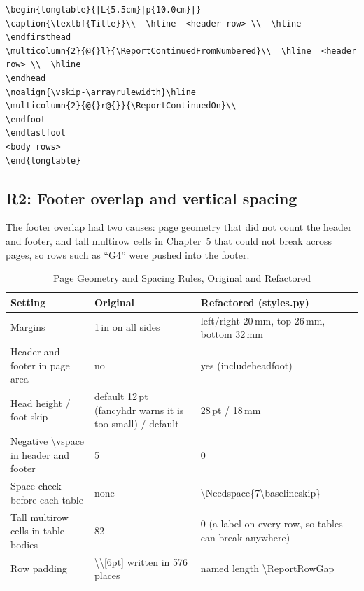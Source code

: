 \documentclass[11pt,a4paper]{article}
\newcommand{\thead}{\rowcolor{headbg}}
\newcommand{\hd}[1]{\sffamily\bfseries\color{ink}#1}
\newcommand{\breakus}{\textunderscore\allowbreak}
\newcommand{\code}[1]{{\ttfamily\let\_\breakus #1}}
\newcommand{\file}[1]{{\ttfamily\let\_\breakus #1}}
\newcommand{\bs}{\textbackslash}
\begin{document}
\begin{lstlisting}
\begin{longtable}{|L{5.5cm}|p{10.0cm}|}
\caption{\textbf{Title}}\\  \hline  <header row> \\  \hline
\endfirsthead
\multicolumn{2}{@{}l}{\ReportContinuedFromNumbered}\\  \hline  <header row> \\  \hline
\endhead
\noalign{\vskip-\arrayrulewidth}\hline
\multicolumn{2}{@{}r@{}}{\ReportContinuedOn}\\
\endfoot
\endlastfoot
<body rows>
\end{longtable}
\end{lstlisting}

\subsection{R2: Footer overlap and vertical spacing}\label{sec:r2}

The footer overlap had two causes: page geometry that did not count the header and footer, and tall \code{multirow}
cells in Chapter~5 that could not break across pages, so rows such as ``G4'' were pushed into the footer.

\begin{table}[!htbp]
\caption{Page Geometry and Spacing Rules, Original and Refactored}
\small
\begin{tabularx}{\linewidth}{@{}L{4.6cm} Y Y@{}}
\toprule
\thead \hd{Setting} & \hd{Original} & \hd{Refactored (\file{styles.py})} \\
\midrule
Margins                         & 1\,in on all sides & left/right 20\,mm, top 26\,mm, bottom 32\,mm \\
Header and footer in page area  & no                 & yes (\code{includeheadfoot}) \\
Head height / foot skip         & default 12\,pt (fancyhdr warns it is too small) / default & 28\,pt / 18\,mm \\
Negative \code{\bs vspace} in header and footer & 5 & 0 \\
Space check before each table   & none               & \code{\bs Needspace\{7\bs baselineskip\}} \\
Tall \code{multirow} cells in table bodies & 82 & 0 (a label on every row, so tables can break anywhere) \\
Row padding                     & \code{\bs\bs[6pt]} written in 576 places & named length \code{\bs ReportRowGap} \\
\bottomrule
\end{tabularx}
\end{table}
\end{document}
